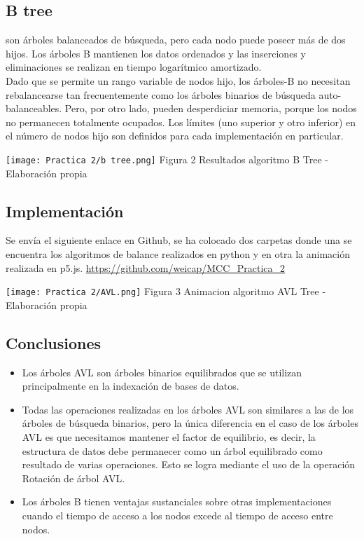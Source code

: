 \documentclass{article}
\begin{document}
 \begin{flushleft}
\subsection{B tree}
son árboles balanceados de búsqueda, pero cada nodo puede poseer más de dos hijos. Los árboles B mantienen los datos ordenados y las inserciones y eliminaciones se realizan en tiempo logarítmico amortizado.\\
 Dado que se permite un rango variable de nodos hijo, los árboles-B no necesitan rebalancearse tan frecuentemente como los árboles binarios de búsqueda auto-balanceables. Pero, por otro lado, pueden desperdiciar memoria, porque los nodos no permanecen totalmente ocupados. Los límites (uno superior y otro inferior) en el número de nodos hijo son definidos para cada implementación en particular.
 \end{flushleft} 
 \center\texttt{[image: Practica 2/b tree.png]}
 \center Figura 2 Resultados algoritmo B Tree - Elaboración propia
\newpage\
 \begin{flushleft}
\section{Implementación}
Se envía el siguiente enlace en Github, se ha colocado dos carpetas donde una se encuentra los algoritmos de balance realizados en python y en otra la animación realizada en p5.js.
\url{https://github.com/weicap/MCC_Practica_2}
 \end{flushleft} 
 \center\texttt{[image: Practica 2/AVL.png]}
 \center Figura 3 Animacion algoritmo AVL Tree - Elaboración propia
\newpage\
  \begin{flushleft}
\section{Conclusiones}
\doublespacing\begin{itemize}
  \item Los árboles AVL son árboles binarios equilibrados que se utilizan principalmente en la indexación de bases de datos.
  \item Todas las operaciones realizadas en los árboles AVL son similares a las de los árboles de búsqueda binarios, pero la única diferencia en el caso de los árboles AVL es que necesitamos mantener el factor de equilibrio, es decir, la estructura de datos debe permanecer como un árbol equilibrado como resultado de varias operaciones. Esto se logra mediante el uso de la operación Rotación de árbol AVL.
  \item Los árboles B tienen ventajas sustanciales sobre otras implementaciones cuando el tiempo de acceso a los nodos excede al tiempo de acceso entre nodos. 

\end{itemize}
\end{flushleft} 
\end{document}

